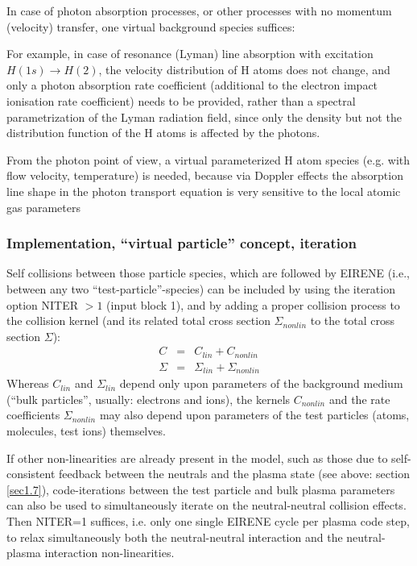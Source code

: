 In case of photon absorption processes, or other processes with no momentum (velocity)
transfer, one virtual background species suffices:

For example, in case of resonance (Lyman) line absorption with excitation $H(1s) \rightarrow H(2)$,
the velocity distribution of H atoms does not change, and only a photon absorption rate
coefficient (additional to the electron impact ionisation rate coefficient) needs to be
provided, rather than a spectral parametrization of the Lyman radiation field, since only the density but not the
distribution function of the H atoms is affected by the photons.

From the photon point of view, a virtual parameterized H atom species (e.g. with flow velocity, temperature)
is needed, because via Doppler effects the absorption line shape in the photon transport equation
is very sensitive to the local atomic gas parameters   


\subsubsection{Implementation, ``virtual particle'' concept, iteration}

Self collisions between those particle species, which are
followed by EIRENE (i.e., between any two ``test-particle''-species)
can be included by using the iteration option NITER $> 1$  (input
block 1), and by adding a proper collision process to the collision
kernel (and its related total cross section $\Sigma_{nonlin}$ to the total cross
section $\Sigma$):
\begin{eqnarray}
C &=& C_{lin} + C_{nonlin}\\
\Sigma &=& \Sigma_{lin} + \Sigma_{nonlin}
\end{eqnarray}
Whereas $C_{lin}$ and $\Sigma_{lin}$ depend only upon parameters of the
background medium (``bulk particles'', usually: electrons and ions),
the kernels $C_{nonlin}$ and the rate coefficients $\Sigma_{nonlin}$ may
also depend upon parameters of the test particles (atoms, molecules,
test ions) themselves.

If other non-linearities are already present in the model, such as those due to
self-consistent feedback between the neutrals and the plasma state
(see above: section \ref{sec1.7}), code-iterations between the test particle and bulk plasma parameters can
also be used to simultaneously iterate on the neutral-neutral collision effects. Then NITER=1 suffices, i.e. only one single EIRENE
cycle per plasma code step, to relax simultaneously
both the neutral-neutral interaction and the neutral-plasma interaction non-linearities.

